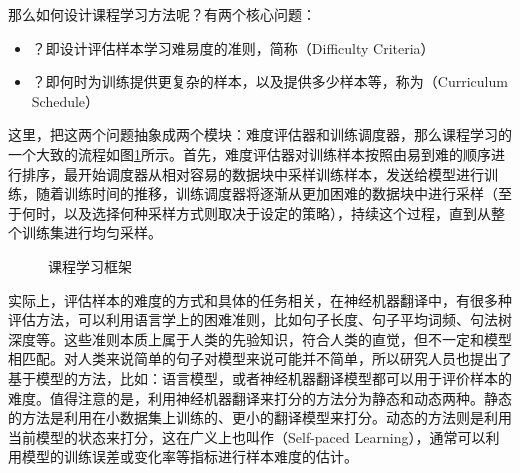 \parinterval 那么如何设计课程学习方法呢？有两个核心问题：

\begin{itemize}
\vspace{0.5em}
\item {\small{}}？即设计评估样本学习难易度的准则，简称{\small{}}（Difficulty Criteria）
\vspace{0.5em}
\item {\small{}}？即何时为训练提供更复杂的样本，以及提供多少样本等，称为{\small{}}（Curriculum Schedule）
\vspace{0.5em}
\end{itemize}

\parinterval 这里，把这两个问题抽象成两个模块：难度评估器和训练调度器，那么课程学习的一个大致的流程如图\ref{fig:13-14}所示。首先，难度评估器对训练样本按照由易到难的顺序进行排序，最开始调度器从相对容易的数据块中采样训练样本，发送给模型进行训练，随着训练时间的推移，训练调度器将逐渐从更加困难的数据块中进行采样（至于何时，以及选择何种采样方式则取决于设定的策略），持续这个过程，直到从整个训练集进行均匀采样。

\begin{figure}[htp]
\centering

\caption{课程学习框架}
\label{fig:13-14}
\end{figure}

\parinterval 实际上，评估样本的难度的方式和具体的任务相关，在神经机器翻译中，有很多种评估方法，可以利用语言学上的困难准则，比如句子长度、句子平均词频、句法树深度等。这些准则本质上属于人类的先验知识，符合人类的直觉，但不一定和模型相匹配。对人类来说简单的句子对模型来说可能并不简单，所以研究人员也提出了基于模型的方法，比如：语言模型，或者神经机器翻译模型都可以用于评价样本的难度。值得注意的是，利用神经机器翻译来打分的方法分为静态和动态两种。静态的方法是利用在小数据集上训练的、更小的翻译模型来打分。动态的方法则是利用当前模型的状态来打分，这在广义上也叫作{\small{}}（Self-paced Learning），通常可以利用模型的训练误差或变化率等指标进行样本难度的估计。


